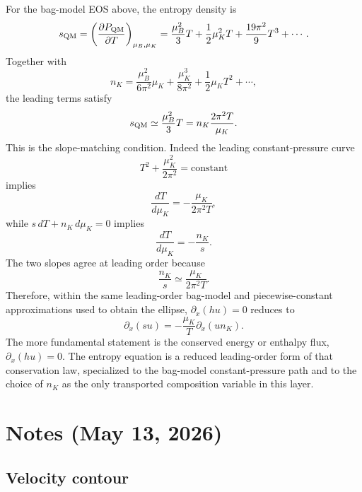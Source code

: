 \documentclass[11pt]{article}
\begin{document}
{For the bag-model EOS above, the entropy density is
\begin{equation}
s_{\rm QM}
=
\left(\frac{\partial P_{\rm QM}}{\partial T}\right)_{\mu_B,\mu_K}
=
\frac{\mu_B^2}{3}T
+
\frac{1}{2}\mu_K^2T
+
\frac{19\pi^2}{9}T^3
+\cdots .
\end{equation}
Together with
\begin{equation}
n_K
=
\frac{\mu_B^2}{6\pi^2}\mu_K
+
\frac{\mu_K^3}{8\pi^2}
+
\frac{1}{2}\mu_KT^2
+\cdots ,
\end{equation}
the leading terms satisfy
\begin{equation}
s_{\rm QM}
\simeq
\frac{\mu_B^2}{3}T
=
n_K\frac{2\pi^2T}{\mu_K}.
\end{equation}
This is the slope-matching condition. Indeed the leading constant-pressure
curve
\begin{equation}
T^2+\frac{\mu_K^2}{2\pi^2}
=
\mathrm{constant}
\end{equation}
implies
\begin{equation}
\frac{dT}{d\mu_K}
=
-\frac{\mu_K}{2\pi^2T},
\end{equation}
while \(s\,dT+n_K\,d\mu_K=0\) implies
\begin{equation}
\frac{dT}{d\mu_K}
=
-\frac{n_K}{s}.
\end{equation}
The two slopes agree at leading order because
\begin{equation}
\frac{n_K}{s}
\simeq
\frac{\mu_K}{2\pi^2T}.
\end{equation}
Therefore, within the same leading-order bag-model and piecewise-constant
approximations used to obtain the ellipse, \(\partial_x(hu)=0\) reduces to
\begin{equation}
\partial_x(su)
=
-\frac{\mu_K}{T}\partial_x(un_K).
\end{equation}
The more fundamental statement is the conserved energy or enthalpy flux,
\(\partial_x(hu)=0\). The entropy equation is a reduced leading-order form of
that conservation law, specialized to the bag-model constant-pressure path and
to the choice of \(n_K\) as the only transported composition variable in this
layer.
}


\newpage

\section{Notes (May 13, 2026)}

\subsection{Velocity contour}
\end{document}
